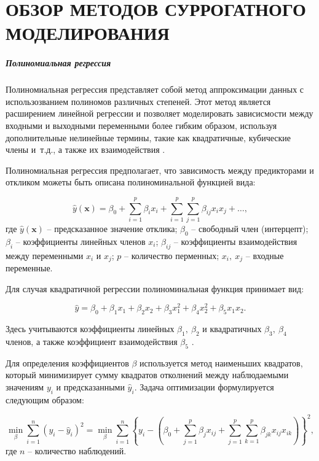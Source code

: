 \chapter{ОБЗОР МЕТОДОВ СУРРОГАТНОГО МОДЕЛИРОВАНИЯ}\label{chap:surrogate-modeling}

\paragraph{Полиномиальная регрессия}

Полиномиальная регрессия представляет собой метод аппроксимации данных
с использозванием полиномов различных степеней. Этот метод является расширением линейной
регрессии и позволяет моделировать зависисмости между входными и выходными переменными более
гибким образом, используя дополнительные нелинейные термины, такие как квадратичные, кубические члены
и~т.д., а также их взаимодействия \cite{fan2018local}.

Полиномиальная регрессия предполагает, что зависимость между предикторами и откликом
можеты быть описана полиноминальной функцией вида:

\begin{equation}
	\hat{y}(\mathbf{x}) = \beta_0 + \sum_{i=1}^{p} \beta_i x_i + \sum_{i=1}^{p} \sum_{j=1}^{p} \beta_{ij} x_i x_j + \ldots,
\end{equation}
где $\hat{y}(\mathbf{x})$ -- предсказанное значение отклика;
$\beta_0$ -- свободный член (интерцепт);
$\beta_i$ -- коэффициенты линейных членов $x_i$;
$\beta_{ij}$ -- коэффициенты взаимодействия между переменными $x_i$ и $x_j$;
$p$ -- количество перменных;
$x_i,~x_j$ -- входные переменные.

Для случая квадратичной регрессии полиноминальная функция принимает вид:

\begin{equation}
	\hat{y} = \beta_0 + \beta_1 x_1 + \beta_2 x_2 + \beta_3 x_1^2
	+ \beta_4 x_2^2 + \beta_5 x_1 x_2.
\end{equation}

Здесь учитываются коэффициенты линейных $\beta_1,~\beta_2$ и квадратичных $\beta_3,~\beta_4$ членов,
а также коэффициент взаимодействия $\beta_5$ \cite{heiberger2009polynomial}.

Для определения коэффициентов $\beta$ используется метод наименьших квадратов,
который минимизирует сумму квадратов отколнений между наблюдаемыми значениям $y_i$
и предсказанными $\hat{y}_i$. Задача оптимизации формулируется следующим образом:

\begin{equation}
	\min_{\beta} \sum_{i=1}^{n} (y_i - \hat{y}_i)^2 =
	\min_{\beta} \sum_{i=1}^{n} \left\{
	y_i - \left(\beta_0 + \sum_{j=1}^{p} \beta_j x_{ij}
	+ \sum_{j=1}^{p} \sum_{k=1}^{p} \beta_{jk} x_{ij} x_{ik}
	\right)
	\right\}^2,
\end{equation}
где $n$ -- количество наблюдений.

